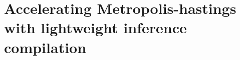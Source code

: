 \documentclass[../../thesis.tex]{subfiles}
\begin{document}
%

%





\chapter{Accelerating Metropolis-hastings with lightweight inference compilation}
\label{ch:lic}
\end{document}
